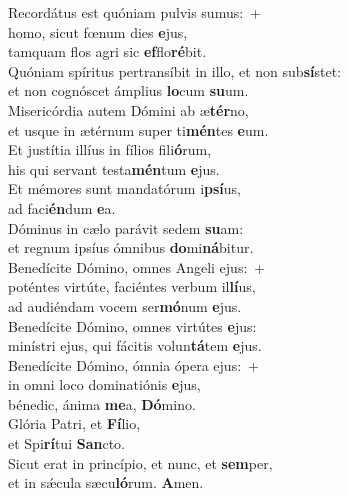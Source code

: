 \evenverse Recordátus est quóniam pulvis sumus:~+\\\evenverse  homo, sicut fœnum dies \textbf{e}jus,~\*\\
\evenverse tamquam flos agri sic \textbf{ef}flo\textbf{ré}bit.\\
\oddverse Quóniam spíritus pertransíbit in illo, et non sub\textbf{sí}stet:~\*\\
\oddverse et non cognóscet ámplius \textbf{lo}cum \textbf{su}um.\\
\evenverse Misericórdia autem Dómini ab æ\textbf{tér}no,~\*\\
\evenverse et usque in ætérnum super ti\textbf{mén}tes \textbf{e}um.\\
\oddverse Et justítia illíus in fílios fili\textbf{ó}rum,~\*\\
\oddverse his qui servant testa\textbf{mén}tum \textbf{e}jus.\\
\evenverse Et mémores sunt mandatórum i\textbf{psí}us,~\*\\
\evenverse ad faci\textbf{én}dum \textbf{e}a.\\
\oddverse Dóminus in cælo parávit sedem \textbf{su}am:~\*\\
\oddverse et regnum ipsíus ómnibus \textbf{do}mi\textbf{ná}bitur.\\
\evenverse Benedícite Dómino, omnes Angeli ejus:~+\\
\evenverse  poténtes virtúte, faciéntes verbum il\textbf{lí}us,~\*\\
\evenverse ad audiéndam vocem ser\textbf{mó}num \textbf{e}jus.\\
\oddverse Benedícite Dómino, omnes virtútes \textbf{e}jus:~\*\\
\oddverse minístri ejus, qui fácitis volun\textbf{tá}tem \textbf{e}jus.\\
\evenverse Benedícite Dómino, ómnia ópera ejus:~+\\
\evenverse  in omni loco dominatiónis \textbf{e}jus,~\*\\
\evenverse bénedic, ánima \textbf{me}a, \textbf{Dó}mino.\\
\oddverse Glória Patri, et \textbf{Fí}lio,~\*\\
\oddverse et Spi\textbf{rí}tui \textbf{San}cto.\\
\evenverse Sicut erat in princípio, et nunc, et \textbf{sem}per,~\*\\
\evenverse et in sǽcula sæcu\textbf{ló}rum. \textbf{A}men.\\
